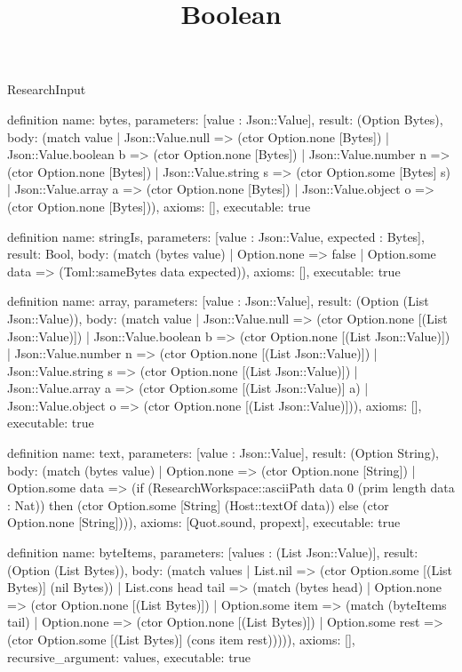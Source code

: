 \begin{lexlean}{ResearchInput}
\title{Boolean}
\begin{semanticmodule}

definition{
 name: bytes,
 parameters: [value : Json::Value],
 result: (Option Bytes),
 body: (match value | Json::Value.null => (ctor Option.none [Bytes]) | Json::Value.boolean b => (ctor Option.none [Bytes]) | Json::Value.number n => (ctor Option.none [Bytes]) | Json::Value.string s => (ctor Option.some [Bytes] s) | Json::Value.array a => (ctor Option.none [Bytes]) | Json::Value.object o => (ctor Option.none [Bytes])),
 axioms: [],
 executable: true
}

definition{
 name: stringIs,
 parameters: [value : Json::Value, expected : Bytes],
 result: Bool,
 body: (match (bytes value) | Option.none => false | Option.some data => (Toml::sameBytes data expected)),
 axioms: [],
 executable: true
}

definition{
 name: array,
 parameters: [value : Json::Value],
 result: (Option (List Json::Value)),
 body: (match value | Json::Value.null => (ctor Option.none [(List Json::Value)]) | Json::Value.boolean b => (ctor Option.none [(List Json::Value)]) | Json::Value.number n => (ctor Option.none [(List Json::Value)]) | Json::Value.string s => (ctor Option.none [(List Json::Value)]) | Json::Value.array a => (ctor Option.some [(List Json::Value)] a) | Json::Value.object o => (ctor Option.none [(List Json::Value)])),
 axioms: [],
 executable: true
}

definition{
 name: text,
 parameters: [value : Json::Value],
 result: (Option String),
 body: (match (bytes value) | Option.none => (ctor Option.none [String]) | Option.some data => (if (ResearchWorkspace::asciiPath data 0 (prim length data : Nat)) then (ctor Option.some [String] (Host::textOf data)) else (ctor Option.none [String]))),
 axioms: [Quot.sound, propext],
 executable: true
}

definition{
 name: byteItems,
 parameters: [values : (List Json::Value)],
 result: (Option (List Bytes)),
 body: (match values | List.nil => (ctor Option.some [(List Bytes)] (nil Bytes)) | List.cons head tail => (match (bytes head) | Option.none => (ctor Option.none [(List Bytes)]) | Option.some item => (match (byteItems tail) | Option.none => (ctor Option.none [(List Bytes)]) | Option.some rest => (ctor Option.some [(List Bytes)] (cons item rest))))),
 axioms: [],
 recursive_argument: values,
 executable: true
}


\end{semanticmodule}
\end{lexlean}
